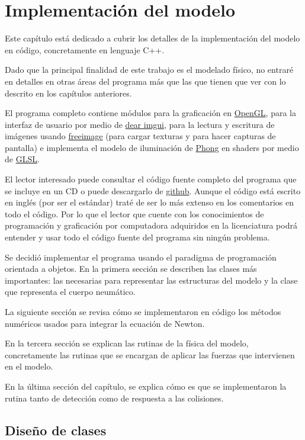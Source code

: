 \chapter{Implementación del modelo}
Este capítulo está dedicado a cubrir los detalles de la implementación del modelo en código, concretamente en lenguaje C++.

Dado que la principal finalidad de este trabajo es el modelado físico, no entraré en detalles en otras áreas del programa más que las que tienen que ver con lo descrito en los capítulos anteriores.

El programa completo contiene módulos para la graficación en \href{http://www.opengl.org/}{OpenGL}, para la interfaz de usuario por medio de \href{https://github.com/ocornut/imgui}{dear imgui}, para la lectura y escritura de imágenes usando \href{http://freeimage.sourceforge.io/}{freeimage} (para cargar texturas y para hacer capturas de pantalla) e implementa el modelo de iluminación de \href{http://en.wikipedia.org/wiki/Phong_reflection_model}{Phong} en shaders por medio de \href{http://www.khronos.org/opengl/wiki/OpenGL_Shading_Language}{GLSL}.

El lector interesado puede consultar el código fuente completo del programa que se incluye en un CD o puede descargarlo de \href{http://github.com/nemediano}{github}.
Aunque el código está escrito en inglés (por ser el estándar) traté de ser lo más extenso en los comentarios en todo el código.
Por lo que el lector que cuente con los conocimientos de programación y graficación por computadora adquiridos en la licenciatura podrá entender y usar todo el código fuente del programa sin ningún problema.

Se decidió implementar el programa usando el paradigma de programación orientada a objetos. 
En la primera sección se describen las clases más importantes: las necesarias para representar las estructuras del modelo y la clase que representa el cuerpo neumático.

La siguiente sección se revisa cómo se implementaron en código los métodos numéricos usados para integrar la ecuación de Newton.

En la tercera sección se explican las rutinas de la física del modelo, concretamente las rutinas que se encargan de aplicar las fuerzas que intervienen en el modelo.

En la última sección del capítulo, se explica cómo es que se implementaron la rutina tanto de detección como de respuesta a las colisiones.

\section{Diseño de clases}

